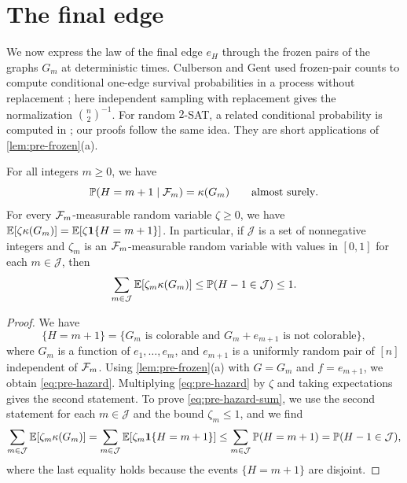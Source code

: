 \section{The final edge}\label{sec:pre-hazard}

We now express the law of the final edge $e_H$ through the frozen pairs of the graphs $G_m$ at deterministic times. Culberson and Gent used frozen-pair counts to compute conditional one-edge survival probabilities in a process without replacement \cite[Section~3.3]{culberson2001frozen}; here independent sampling with replacement gives the normalization $\binom{n}{2}^{-1}$. For random $2$-SAT, a related conditional probability is computed in \cite[Section~3.3]{bollobas2001scaling}; our proofs follow the same idea. They are short applications of \cref{lem:pre-frozen}(a).

\begin{lemma}\label{lem:pre-hazard}
For all integers $m \ge 0$, we have
\begin{equation}\label{eq:pre-hazard}
\mathbb P(H = m + 1 \mid \mathcal F_m) = \kappa(G_m) \qquad \text{almost surely}.
\end{equation}
For every $\mathcal F_m$-measurable random variable $\zeta \ge 0$, we have $\mathbb E[\zeta \kappa(G_m)] = \mathbb E[\zeta \mathbf 1\{H = m + 1\}]$. In particular, if $\mathcal J$ is a set of nonnegative integers and $\zeta_m$ is an $\mathcal F_m$-measurable random variable with values in $[0, 1]$ for each $m \in \mathcal J$, then
\begin{equation}\label{eq:pre-hazard-sum}
\sum_{m \in \mathcal J} \mathbb E[\zeta_m \kappa(G_m)] \le \mathbb P(H - 1 \in \mathcal J) \le 1.
\end{equation}
\end{lemma}

\begin{proof}
We have
\[
\{H = m + 1\} = \{G_m \text{ is colorable and } G_m + e_{m + 1} \text{ is not colorable}\},
\]
where $G_m$ is a function of $e_1, \dots, e_m$, and $e_{m + 1}$ is a uniformly random pair of $[n]$ independent of $\mathcal F_m$. Using \cref{lem:pre-frozen}(a) with $G = G_m$ and $f = e_{m + 1}$, we obtain \eqref{eq:pre-hazard}. Multiplying \eqref{eq:pre-hazard} by $\zeta$ and taking expectations gives the second statement. To prove \eqref{eq:pre-hazard-sum}, we use the second statement for each $m \in \mathcal J$ and the bound $\zeta_m \le 1$, and we find
\[
\sum_{m \in \mathcal J} \mathbb E[\zeta_m \kappa(G_m)] = \sum_{m \in \mathcal J} \mathbb E[\zeta_m \mathbf 1\{H = m + 1\}] \le \sum_{m \in \mathcal J} \mathbb P(H = m + 1) = \mathbb P(H - 1 \in \mathcal J),
\]
where the last equality holds because the events $\{H = m + 1\}$ are disjoint.
\end{proof}

